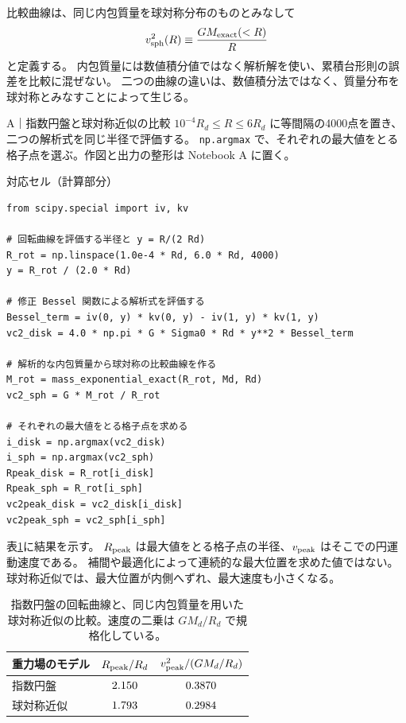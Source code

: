 比較曲線は、同じ内包質量を球対称分布のものとみなして
\begin{equation}
 v_{\rm sph}^2(R)\equiv\frac{GM_{\rm exact}(<R)}{R}
\label{eq:appA-spherical-comparison}
\end{equation}
と定義する。
内包質量には数値積分値ではなく解析解を使い、累積台形則の誤差を比較に混ぜない。
二つの曲線の違いは、数値積分法ではなく、質量分布を球対称とみなすことによって生じる。

\begin{notebookblock}{A｜指数円盤と球対称近似の比較}
$10^{-4}R_d\le R\le6R_d$ に等間隔の4000点を置き、二つの解析式を同じ半径で評価する。
\texttt{np.argmax} で、それぞれの最大値をとる格子点を選ぶ。作図と出力の整形は Notebook A に置く。

{\sffamily\small\color{graytext}対応セル（計算部分）}
\begin{Verbatim}[xleftmargin=2mm,fontsize=\footnotesize,frame=single,framesep=1.8mm,framerule=0.35pt,rulecolor=\color{listingframe},fillcolor=\color{listingbg}]
from scipy.special import iv, kv

# 回転曲線を評価する半径と y = R/(2 Rd)
R_rot = np.linspace(1.0e-4 * Rd, 6.0 * Rd, 4000)
y = R_rot / (2.0 * Rd)

# 修正 Bessel 関数による解析式を評価する
Bessel_term = iv(0, y) * kv(0, y) - iv(1, y) * kv(1, y)
vc2_disk = 4.0 * np.pi * G * Sigma0 * Rd * y**2 * Bessel_term

# 解析的な内包質量から球対称の比較曲線を作る
M_rot = mass_exponential_exact(R_rot, Md, Rd)
vc2_sph = G * M_rot / R_rot

# それぞれの最大値をとる格子点を求める
i_disk = np.argmax(vc2_disk)
i_sph = np.argmax(vc2_sph)
Rpeak_disk = R_rot[i_disk]
Rpeak_sph = R_rot[i_sph]
vc2peak_disk = vc2_disk[i_disk]
vc2peak_sph = vc2_sph[i_sph]
\end{Verbatim}
\end{notebookblock}

表\ref{tab:appA-rotation-peaks}に結果を示す。
$R_{\rm peak}$ は最大値をとる格子点の半径、$v_{\rm peak}$ はそこでの円運動速度である。
補間や最適化によって連続的な最大位置を求めた値ではない。
球対称近似では、最大位置が内側へずれ、最大速度も小さくなる。

\begin{table}[!htbp]
\centering
\caption{指数円盤の回転曲線と、同じ内包質量を用いた球対称近似の比較。速度の二乗は $GM_d/R_d$ で規格化している。}
\label{tab:appA-rotation-peaks}
\begin{tabular}{lcc}
\toprule
重力場のモデル & $R_{\rm peak}/R_d$ & $v_{\rm peak}^2/(GM_d/R_d)$\\
\midrule
指数円盤 & $2.150$ & $0.3870$\\
球対称近似 & $1.793$ & $0.2984$\\
\bottomrule
\end{tabular}
\end{table}


